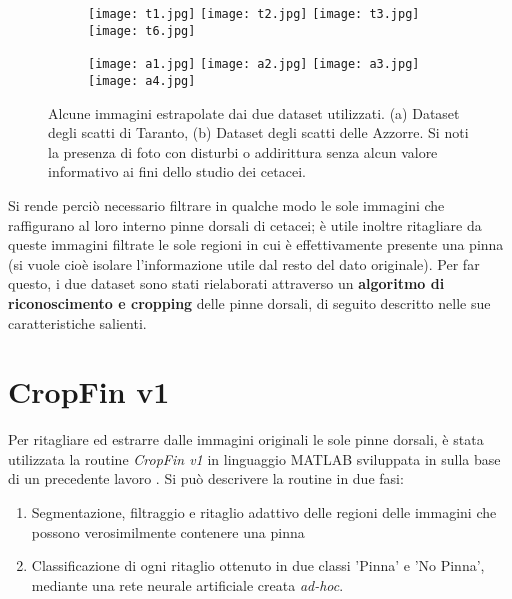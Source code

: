 \begin{figure}[h]

  \centering
  
  \begin{subfigure}[b]{\textwidth}
    \texttt{[image: t1.jpg]}
    \hfill
    \texttt{[image: t2.jpg]}
    \hfill
    \texttt{[image: t3.jpg]}
    \hfill
    \texttt{[image: t6.jpg]}
    \caption{}
  \end{subfigure}
  
  \vspace{5mm}
  
  \begin{subfigure}[b]{\textwidth}
    \texttt{[image: a1.jpg]}
    \hfill
    \texttt{[image: a2.jpg]}
    \hfill
    \texttt{[image: a3.jpg]}
    \hfill
    \texttt{[image: a4.jpg]}
    \caption{}
  \end{subfigure}
  
  \caption{Alcune immagini estrapolate dai due dataset utilizzati. (a) Dataset degli scatti di Taranto, (b) Dataset degli scatti delle Azzorre. Si noti la presenza di foto con disturbi o addirittura senza alcun valore informativo ai fini dello studio dei cetacei.}
  \label{fig:esempiDataset}
\end{figure}

Si rende perciò necessario filtrare in qualche modo le sole immagini che raffigurano al loro interno pinne dorsali di cetacei; è utile inoltre ritagliare da queste immagini filtrate le sole regioni in cui è effettivamente presente una pinna (si vuole cioè isolare l'informazione utile dal resto del dato originale). Per far questo, i due dataset sono stati rielaborati attraverso un \textbf{algoritmo di riconoscimento e cropping} delle pinne dorsali, di seguito descritto nelle sue caratteristiche salienti.

\section{CropFin v1}
\label{cropFin}
Per ritagliare ed estrarre dalle immagini originali le sole pinne dorsali, è stata utilizzata la routine \textit{CropFin v1} in linguaggio MATLAB sviluppata in \cite{gianvito} sulla base di un precedente lavoro  \cite{flavio}.
Si può descrivere la routine in due fasi:
\begin{enumerate}
\item Segmentazione, filtraggio e ritaglio adattivo delle regioni delle immagini che possono verosimilmente contenere una pinna
\item Classificazione di ogni ritaglio ottenuto in due classi 'Pinna' e 'No Pinna', mediante una rete neurale artificiale creata \textit{ad-hoc}.
\end{enumerate}

